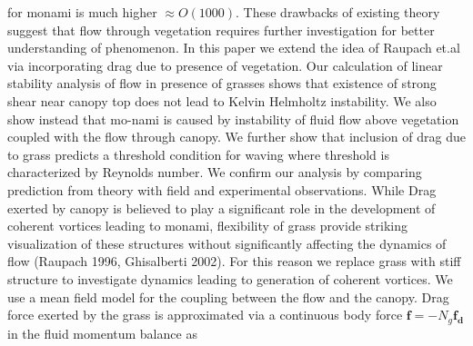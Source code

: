 \documentclass[aps,twocolumn,floatfix,prl,10pt]{revtex4-1}
\begin{document}
for monami is much higher $\approx O(1000)$. These drawbacks of existing theory suggest that flow through vegetation requires further investigation for better understanding of
phenomenon.
\newline 
In this paper we extend the idea of Raupach et.al via incorporating drag due to presence of vegetation. Our calculation of linear stability analysis of flow in presence of grasses 
shows that existence of strong shear near canopy top does not lead to Kelvin Helmholtz instability. We also show instead that mo-nami is caused by instability 
of fluid flow above vegetation coupled with the flow through canopy. We further show that inclusion of drag due to grass predicts a threshold condition for waving where threshold is
characterized by Reynolds number. We confirm our analysis by comparing prediction from theory with field and experimental observations.  
\newline
While Drag exerted by canopy is believed to play 
a significant role in the development of coherent vortices leading to monami, flexibility of grass provide striking visualization of these structures without significantly affecting the
dynamics of flow (Raupach 1996, Ghisalberti 2002). For this reason we replace grass with stiff structure to investigate dynamics leading to generation of 
coherent vortices. We use a mean field model for the coupling between the flow and the canopy. 
Drag force exerted by the grass is approximated via a continuous body force $\mathbf{f}=-N_g\mathbf{f_d}$ in the fluid momentum balance as
\end{document}
